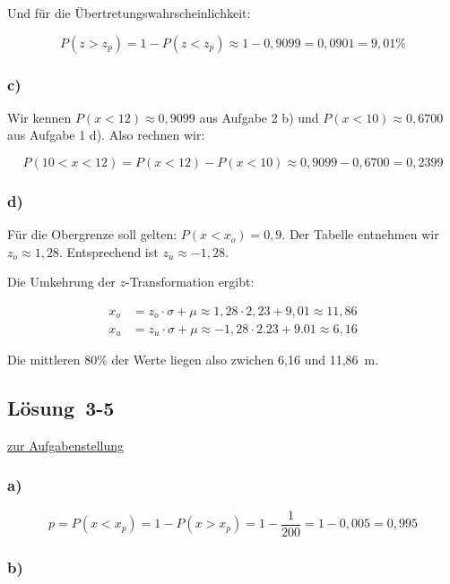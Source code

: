 \documentclass[
  11pt,
  ngerman,
  a4paper,
]{report}
\begin{document}
Und für die Übertretungswahrscheinlichkeit:

\[P(z>z_p) = 1- P(z<z_p) \approx 1-0,9099 = 0,0901= 9,01\% \]

\hypertarget{c-9}{%
\subsubsection{c)}\label{c-9}}

Wir kennen \(P(x < 12)\approx0,9099\) aus Aufgabe 2 b) und \(P(x<10)\approx0,6700\) aus Aufgabe 1 d). Also rechnen wir:

\[P(10<x<12) = P(x<12) - P(x<10) \approx 0,9099 - 0,6700 = 0,2399\]

\hypertarget{d-4}{%
\subsubsection{d)}\label{d-4}}

Für die Obergrenze soll gelten: \(P(x<x_o) = 0,9\). Der Tabelle entnehmen wir \(z_o \approx 1,28\). Entsprechend ist \(z_u\approx-1,28\).

Die Umkehrung der \(z\)-Transformation ergibt:

\[\begin{aligned}
x_o&=z_o\cdot\sigma + \mu\approx1,28\cdot2,23 +9,01\approx11,86\\
x_u&=z_u\cdot\sigma + \mu\approx-1,28\cdot2.23 +9.01\approx6,16
\end{aligned}\]

Die mittleren 80\% der Werte liegen also zwichen 6,16 und 11,86~m.

\hypertarget{loesung-3-5}{%
\subsection{Lösung~3-5}\label{loesung-3-5}}

\protect\hyperlink{aufgabe-3-5}{zur Aufgabenstellung}

\hypertarget{a-12}{%
\subsubsection{a)}\label{a-12}}

\[p=P(x<x_p)=1-P(x>x_p)=1-\frac{1}{200}=1-0,005=0,995\]

\hypertarget{b-12}{%
\subsubsection{b)}\label{b-12}}
\end{document}
